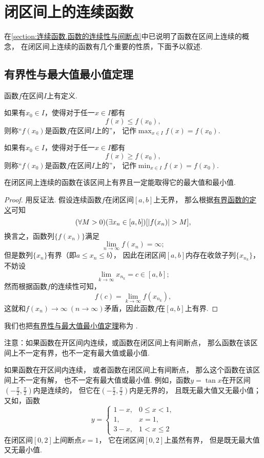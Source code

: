 \section{闭区间上的连续函数}
在\cref{section:连续函数.函数的连续性与间断点}中已说明了函数在区间上连续的概念，
在闭区间上连续的函数有几个重要的性质，下面予以叙述.

\subsection{有界性与最大值最小值定理}
\begin{definition}
函数\(f\)在区间\(I\)上有定义.

如果有\(x_0 \in I\)，使得对于任一\(x \in I\)都有\[
	f(x) \leq f(x_0),
\]
则称“\(f(x_0)\)是函数\(f\)在区间\(I\)上的”，
记作\(\max_{x \in I}f(x) = f(x_0)\).

如果有\(x_0 \in I\)，使得对于任一\(x \in I\)都有\[
	f(x) \geq f(x_0),
\]
则称“\(f(x_0)\)是函数\(f\)在区间\(I\)上的”，
记作\(\min_{x \in I}f(x) = f(x_0)\).
\end{definition}

\begin{theorem}[有界性与最大值最小值定理]\label{theorem:极限.最值定理}
在闭区间上连续的函数在该区间上有界且一定能取得它的最大值和最小值.
\begin{proof}
用反证法.
假设连续函数\(f\)在闭区间\([a,b]\)上无界，
那么根据\hyperref[definition:函数.函数的有界性]{有界函数的定义}可知\[
	(\forall M>0)
	(\exists x_n\in[a,b])
	[\abs{f(x_n)} > M],
\]
换言之，函数列\(\{f(x_n)\}\)满足\[
	\lim_{n\to\infty} f(x_n) = \infty;
\]
但是数列\(\{x_n\}\)有界（即\(a \leq x_n \leq b\)），
因此在闭区间\([a,b]\)内存在收敛子列\(\{x_{n_k}\}\)，
不妨设\[
	\lim_{k\to\infty} x_{n_k} = c \in [a,b];
\]
然而根据函数\(f\)的连续性可知，\[
	f(c) = \lim_{k\to\infty} f(x_{n_k}),
\]
这就和\(f(x_n)\to\infty\ (n\to\infty)\)矛盾，因此函数\(f\)在\([a,b]\)上有界.
\end{proof}
\end{theorem}
我们也把\hyperref[theorem:极限.最值定理]{有界性与最大值最小值定理}称为%
.

注意：如果函数在开区间内连续，或函数在闭区间上有间断点，
那么函数在该区间上不一定有界，也不一定有最大值或最小值.

如果函数在开区间内连续，
或者函数在闭区间上有间断点，
那么这个函数在该区间上不一定有解，
也不一定有最大值或最小值.
例如，函数\(y=\tan x\)在开区间\(\left(-\frac{\pi}{2},\frac{\pi}{2}\right)\)内是连续的，
但它在\(\left(-\frac{\pi}{2},\frac{\pi}{2}\right)\)内是无界的，
且既无最大值又无最小值；
又如，函数\[
	y=\left\{ \begin{array}{ll}
		1-x, & 0\leq x<1, \\
		1, & x=1, \\
		3-x, & 1<x\leq2
	\end{array} \right.
\]在闭区间\([0,2]\)上间断点\(x=1\)，
它在闭区间\([0,2]\)上虽然有界，
但是既无最大值又无最小值.


